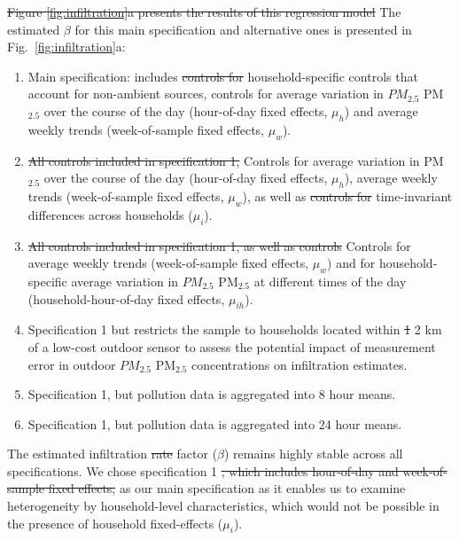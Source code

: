 \documentclass[reqno,12pt,notitlepage]{article}
\providecommand{\DIFadd}[1]{{\protect\color{BLUE}#1}} %
\providecommand{\DIFdel}[1]{{\protect\color{red}\sout{#1}}} %
\providecommand{\DIFaddbegin}{} %
\providecommand{\DIFaddend}{} %
\providecommand{\DIFdelbegin}{} %
\providecommand{\DIFdelend}{} %
\begin{document}
\DIFdelbegin \DIFdel{Figure \ref{fig:infiltration}a presents the results of this regression model }\DIFdelend \DIFaddbegin \DIFadd{The estimated $\beta$ }\DIFaddend for this main specification and alternative ones \DIFaddbegin \DIFadd{is presented in Fig.\ \ref{fig:infiltration}a}\DIFaddend : 
\begin{enumerate}
    \item Main specification: includes \DIFdelbegin \DIFdel{controls for }\DIFdelend \DIFaddbegin \DIFadd{household-specific controls that account for non-ambient sources, controls for }\DIFaddend average variation in \DIFdelbegin \DIFdel{$PM_{2.5}$ }\DIFdelend \DIFaddbegin \DIFadd{PM$_{2.5}$ }\DIFaddend over the course of the day (hour-of-day fixed effects, $\mu_h$) and average weekly trends (week-of-sample fixed effects, $\mu_w$).
    \item \DIFdelbegin \DIFdel{All controls included in specification 1, }\DIFdelend \DIFaddbegin \DIFadd{Controls for average variation in PM$_{2.5}$ over the course of the day (hour-of-day fixed effects, $\mu_h$),  average weekly trends (week-of-sample fixed effects, $\mu_w$), }\DIFaddend as well as \DIFdelbegin \DIFdel{controls for }\DIFdelend time-invariant differences across households ($\mu_i$).
    \item \DIFdelbegin \DIFdel{All controls included in specification 1, as well as controls }\DIFdelend \DIFaddbegin \DIFadd{Controls for average weekly trends (week-of-sample fixed effects, $\mu_w$) and }\DIFaddend for household-specific average variation in \DIFdelbegin \DIFdel{$PM_{2.5}$ }\DIFdelend \DIFaddbegin \DIFadd{PM$_{2.5}$ }\DIFaddend at different times of the day (household-hour-of-day fixed effects, $\mu_{ih}$).
    \item Specification 1 but restricts the sample to households located within \DIFdelbegin \DIFdel{1 }\DIFdelend \DIFaddbegin \DIFadd{2 }\DIFaddend km of a low-cost outdoor sensor to assess the potential impact of measurement error in outdoor \DIFdelbegin \DIFdel{$PM_{2.5}$ }\DIFdelend \DIFaddbegin \DIFadd{PM$_{2.5}$ }\DIFaddend concentrations on infiltration estimates.
    \DIFaddbegin \item \DIFadd{Specification 1, but pollution data is aggregated into 8 hour means. }
    \item \DIFadd{Specification 1, but pollution data is aggregated into 24 hour means. }
\DIFaddend \end{enumerate}

The estimated infiltration \DIFdelbegin \DIFdel{rate }\DIFdelend \DIFaddbegin \DIFadd{factor }\DIFaddend ($\beta$) remains highly stable across all specifications. We chose specification 1 \DIFdelbegin \DIFdel{, which includes hour-of-day and week-of-sample fixed effects, }\DIFdelend as our main specification as it enables us to examine heterogeneity by household-level characteristics, which would not be possible in the presence of household fixed-effects ($\mu_i$). 
\\ 
\end{document}
